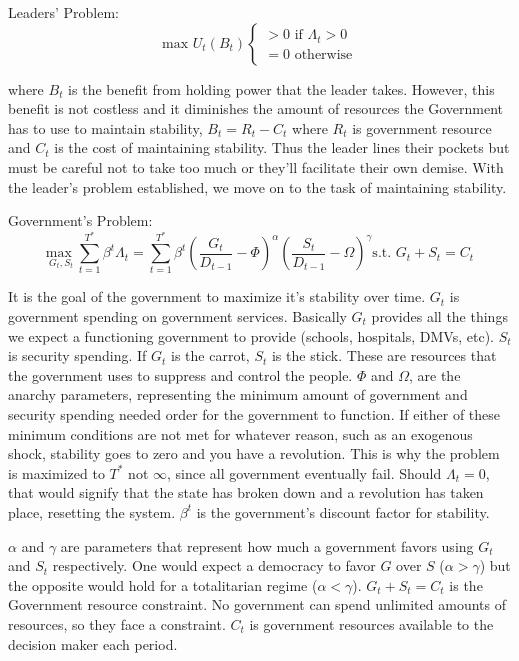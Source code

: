 \documentclass[12pt]{article}
\begin{document}
\begin{spacing}{1.5}
\vspace{.5 em}
\noindent Leaders' Problem:
\begin{equation}
	 \text{max } U_t(B_t) \begin{cases}
		>0 \text{ if } \Lambda_t > 0 \\
		= 0 \text{ otherwise} 	
	\end{cases}
\end{equation} 

\noindent where $B_t$ is the benefit from holding power that the leader takes. However, this benefit is not costless and it diminishes the amount of resources the Government has to use to maintain stability, $B_t=R_t-C_t$ where $R_t$ is government resource and $C_t$ is the cost of maintaining stability. Thus the leader lines their pockets but must be careful not to take too much or they'll facilitate their own demise. With the leader's problem established, we move on to the task of maintaining stability.   
\vspace{.5 em}

\noindent Government's Problem:
\begin{equation}
{\underset{G_t,S_t}{\text{max }}} \sum\limits_{t=1}^{T^*} \beta^t {\Lambda}_t = \sum\limits_{t=1}^{T^*} \beta^t\left(\frac{G_t}{D_{t-1}}-\Phi\right)^\alpha \left(\frac{S_t}{D_{t-1}}-\Omega\right)^\gamma   \text{s.t. } G_t+S_t=C_t
\end{equation}

It is the goal of the government to maximize it's stability over time. $G_t$ is government spending on government services. Basically $G_t$ provides all the things we expect a functioning government to provide (schools, hospitals, DMVs, etc). $S_t$ is security spending. If $G_t$ is the carrot, $S_t$ is the stick. These are resources that the government uses to suppress and control the people. 
$\Phi$ and $\Omega$, are the anarchy parameters, representing the minimum amount of government and security spending needed order for the government to function. If either of these minimum conditions are not met for whatever reason, such as an exogenous shock, stability goes to zero and you have a revolution. This is why the problem is maximized to $T^*$ not $\infty$, since all government eventually fail. Should $\Lambda_t=0$, that would signify that the state has broken down and a revolution has taken place, resetting the system. $\beta^t$ is the government's discount factor for stability. 

$\alpha$ and $\gamma $  are parameters that represent how much a government favors using $G_t$ and $S_t$ respectively. One would expect a democracy to favor $G$ over $S$ ($\alpha > \gamma$) but the opposite would hold for a totalitarian regime ($\alpha < \gamma $). $G_t+S_t=C_t$ is the Government resource constraint. No government can spend unlimited amounts of resources, so they face a constraint. $C_t$ is government resources available to the decision maker each period. 


\end{spacing}
\end{document}
